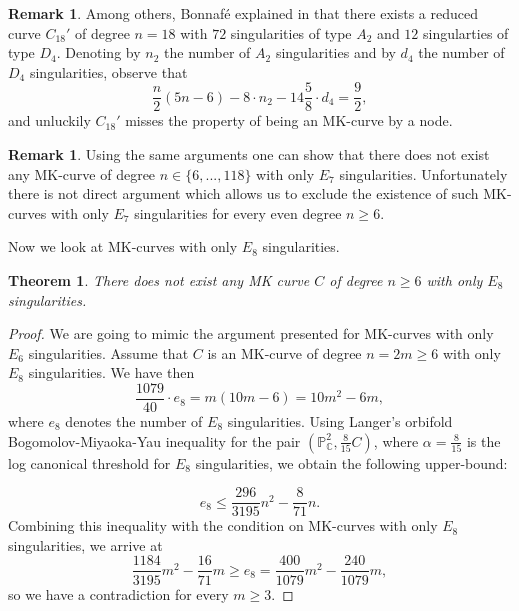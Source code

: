 \documentclass[11pt]{amsart}
\theoremstyle{plain}
\newtheorem{theorem}[thm]{Theorem}
\theoremstyle{definition}
\newtheorem{remark}[thm]{Remark}
\numberwithin{equation}{section}
\begin{document}
\begin{remark}
\label{rkB}
Among others, Bonnaf\'e explained in \cite{Bonnafe} that there exists a reduced curve $C_{18}'$ of degree $n=18$ with $72$ singularities of type $A_{2}$ and $12$ singularties of type $D_{4}$. Denoting by $n_2$ the number of $A_{2}$ singularities and by $d_{4}$ the number of $D_{4}$ singularities, observe that
$$\frac{n}{2}(5n-6) - 8\cdot n_{2} - 14\frac{5}{8}\cdot d_{4} = \frac{9}{2},$$
and unluckily $C_{18}'$ misses the property of being an MK-curve by a node.
\end{remark}
\begin{remark}
Using the same arguments one can show that there does not exist any MK-curve of degree $n \in \{6, ..., 118\}$ with only $E_{7}$ singularities. Unfortunately there is not direct argument which allows us to exclude the existence of such MK-curves with only $E_{7}$ singularities for every even degree $n\geq 6$.
\end{remark}
Now we look at MK-curves with only $E_{8}$ singularities.
\begin{theorem}
\label{thmE8}
There does not exist any MK curve $C$ of degree $n\geq 6$ with only $E_{8}$ singularities.
\end{theorem}
\begin{proof}
We are going to mimic the argument presented for MK-curves with only $E_{6}$ singularities. Assume that $C$ is an MK-curve of degree $n=2m\geq 6$ with only $E_{8}$ singularities. We have then
\begin{equation}
\frac{1079}{40}\cdot e_{8}=m(10m-6) = 10m^{2}-6m,
\end{equation}
where $e_{8}$ denotes the number of $E_{8}$ singularities. Using Langer's orbifold Bogomolov-Miyaoka-Yau inequality for the pair $(\mathbb{P}^{2}_{\mathbb{C}},\frac{8}{15}C)$, where $\alpha=\frac{8}{15}$ is the log canonical threshold for $E_{8}$ singularities, we obtain the following upper-bound:

\begin{equation}
e_{8}\leq \frac{296}{3195}n^{2}-\frac{8}{71}n.
\end{equation}
Combining this inequality with the condition on MK-curves with only $E_{8}$ singularities, we arrive at
\begin{equation}
\frac{1184}{3195} m^{2}-\frac{16}{71} m \geq e_{8} = \frac{400}{1079}m^{2}-\frac{240}{1079}m,
\end{equation}
so we have a contradiction for every $m\geq 3$.
\end{proof}
\end{document}
